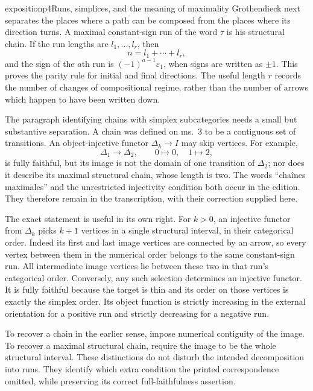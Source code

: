 \begin{dcomment}{exposition}{p4}{Runs, simplices, and the meaning of maximality}
Grothendieck next separates the places where a path can be composed from the places where its direction turns. A maximal constant-sign run of the word $\tau$ is his structural chain. If the run lengths are $l_1,\ldots,l_r$, then
\[
 n=l_1+\cdots+l_r,
\]
and the sign of the $a$th run is $(-1)^{a-1}\varepsilon_1$, when signs are written as $\pm1$. This proves the parity rule for initial and final directions. The useful length $r$ records the number of changes of compositional regime, rather than the number of arrows which happen to have been written down.

The paragraph identifying chains with simplex subcategories needs a small but substantive separation. A chain was defined on ms.~3 to be a contiguous set of transitions. An object-injective functor $\Delta_k\to I$ may skip vertices. For example,
\[
 \Delta_1\longrightarrow\Delta_2,
 \qquad 0\longmapsto0,\quad1\longmapsto2,
\]
is fully faithful, but its image is not the domain of one transition of $\Delta_2$; nor does it describe its maximal structural chain, whose length is two. The words ``chaînes maximales'' and the unrestricted injectivity condition both occur in the edition. They therefore remain in the transcription, with their correction supplied here.

The exact statement is useful in its own right. For $k>0$, an injective functor from $\Delta_k$ picks $k+1$ vertices in a single structural interval, in their categorical order. Indeed its first and last image vertices are connected by an arrow, so every vertex between them in the numerical order belongs to the same constant-sign run. All intermediate image vertices lie between these two in that run's categorical order. Conversely, any such selection determines an injective functor. It is fully faithful because the target is thin and its order on those vertices is exactly the simplex order. Its object function is strictly increasing in the external orientation for a positive run and strictly decreasing for a negative run.

To recover a chain in the earlier sense, impose numerical contiguity of the image. To recover a maximal structural chain, require the image to be the whole structural interval. These distinctions do not disturb the intended decomposition into runs. They identify which extra condition the printed correspondence omitted, while preserving its correct full-faithfulness assertion.
\end{dcomment}


